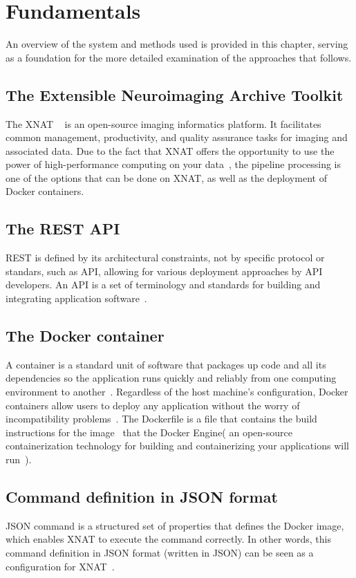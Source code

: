 
\chapter{Fundamentals}

An overview of the system and methods used is provided in this chapter, serving as a foundation for the more detailed examination of the approaches that follows. 

\section{The Extensible Neuroimaging Archive Toolkit}
The \ac{XNAT} ~\cite{marcus_extensible_2007} is an open-source imaging informatics platform. It facilitates common management, productivity, and quality assurance tasks for imaging and associated data. Due to the fact that XNAT offers the opportunity to use the power of high-performance computing on your data~\cite{zaschke_extending_2024}, 
 the pipeline processing is one of the options that can be done on XNAT, as well as the deployment of Docker containers.


\section{The REST API}
\ac{REST} is defined by its architectural constraints, not by specific protocol or standars, such as API, allowing for various deployment approaches by API developers.
An \ac{API} is a set of terminology and standards for building and integrating application software~\cite{REST_API}.

\section{The Docker container}
A container is a standard unit of software that packages up code and all its dependencies so the application runs quickly and reliably from one computing environment to another~\cite{DockerContainer}.
Regardless of the host machine's configuration, Docker containers allow users to deploy any application without the worry of incompatibility problems~\cite{what_is_Docker_Container}. The Dockerfile is a file that contains the build instructions for the image~\cite{Dockerfile} that the Docker Engine( an open-source containerization technology for building and containerizing your applications will run~\cite{DockerEngine}).
\\
\section{Command definition in JSON format}
\ac{JSON} command is a structured set of properties that defines the Docker image, which enables XNAT to execute the command correctly. In other words, this command definition in JSON format (written in JSON) can be seen as a configuration for XNAT~\cite{JSONCommand}.

